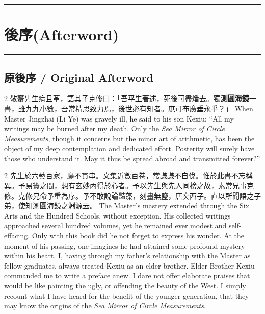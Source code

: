 \documentclass[11pt,a4paper]{article}
\newcommand{\longline}{\noindent\rule{\textwidth}{0.4pt}}
\newcommand{\bilingualsection}[2]{\section*{#1\quad(#2)}}
\begin{document}
\vspace{0.5cm}
\longline

\newpage

\bilingualsection{後序}{Afterword}

\longline

\subsection*{原後序 / Original Afterword}

\begin{paracol}{2}
敬齋先生病且革，語其子克修曰：「吾平生著述，死後可盡燔去。獨\textbf{測圓海鏡}一書，雖九九小數，吾常精思致力焉，後世必有知者。庶可布廣垂永乎？」
\switchcolumn
When Master Jingzhai (Li Ye) was gravely ill, he said to his son Kexiu: ``All my writings may be burned after my death. Only the \textit{Sea Mirror of Circle Measurements}, though it concerns but the minor art of arithmetic, has been the object of my deep contemplation and dedicated effort. Posterity will surely have those who understand it. May it thus be spread abroad and transmitted forever?''
\end{paracol}

\vspace{0.3cm}

\begin{paracol}{2}
先生於六藝百家，靡不貫串。文集近數百卷，常謙謙不自伐。惟於此書不忘稱異。予易簀之間，想有玄妙內得於心者。予以先生與先人同榜之故，素常兄事克修。克修兄命予重為序。予不敢說論豔藻，刻畫無鹽，唐突西子。直以所聞語之子弟，使知測圓海鏡之淵源云。
\switchcolumn
The Master's mastery extended through the Six Arts and the Hundred Schools, without exception. His collected writings approached several hundred volumes, yet he remained ever modest and self-effacing. Only with this book did he not forget to express his wonder. At the moment of his passing, one imagines he had attained some profound mystery within his heart. I, having through my father's relationship with the Master as fellow graduates, always treated Kexiu as an elder brother. Elder Brother Kexiu commanded me to write a preface anew. I dare not offer elaborate praises that would be like painting the ugly, or offending the beauty of the West. I simply recount what I have heard for the benefit of the younger generation, that they may know the origins of the \textit{Sea Mirror of Circle Measurements}.
\end{paracol}
\end{document}
